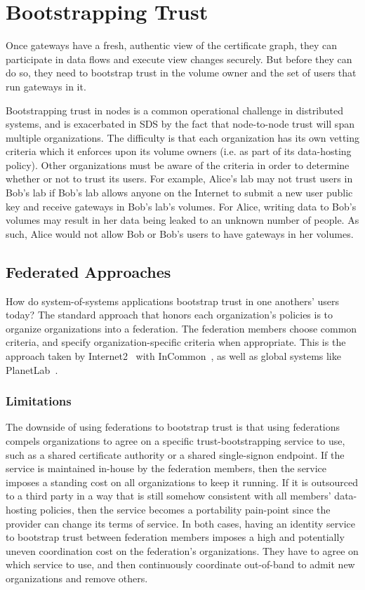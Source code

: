 \section{Bootstrapping Trust}
\label{sec:bootstrapping-trust}

Once gateways have a fresh, authentic view of the certificate graph, they can
participate in data flows and execute view changes securely.  But before they
can do so, they need to bootstrap trust in the volume owner and the set of users
that run gateways in it.

Bootstrapping trust in nodes is a common operational challenge in
distributed systems, and is exacerbated in SDS by the fact that node-to-node
trust will span multiple organizations.
The difficulty is that each organization has its own vetting criteria which it
enforces upon its volume owners (i.e. as part of its data-hosting policy).
Other organizations must be aware of the criteria in order to determine
whether or not to trust its users.  For example, Alice's lab may
not trust users in Bob's lab if Bob's lab allows anyone on the Internet
to submit a new user public key and receive gateways in Bob's
lab's volumes.  For Alice, writing data to Bob's volumes may result in her data
being leaked to an unknown number of people.  As such, Alice would not allow Bob
or Bob's users to have gateways in her volumes.

\subsection{Federated Approaches}

How do system-of-systems applications bootstrap trust in one anothers' users
today?  The standard approach that honors each organization's policies is to organize
organizations into a federation.  The federation members choose common criteria,
and specify organization-specific criteria when appropriate.  This is the
approach taken by Internet2~\cite{internet2} with InCommon~\cite{incommon}, as
well as global systems like PlanetLab~\cite{planet-lab}.

\subsubsection{Limitations}

The downside of using federations to bootstrap trust is that using federations compels
organizations to agree on a specific trust-bootstrapping service to use, such as
a shared certificate authority or a shared single-signon endpoint.  If the
service is maintained in-house by the
federation members, then the service imposes a standing cost on all organizations to keep it
running.  If it is outsourced to a third party in a way that is still somehow
consistent with all members' data-hosting policies, then the service becomes a portability
pain-point since the provider can change its terms of service.  In both cases,
having an identity service to bootstrap trust between federation members imposes
a high and potentially uneven coordination cost on the federation's organizations.
They have to agree on which service to use, and then continuously
coordinate out-of-band to admit new organizations and remove others.

